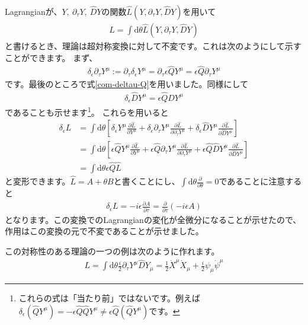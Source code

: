 \documentclass[report,paper=a4, fontsize=12pt, line_length=16cm, number_of_lines=34,dvipdfmx]{jlreq}
\numberwithin{equation}{chapter}
\numberwithin{equation}{section}
\newcommand{\del}{\partial}
\newcommand{\deldel}[2]{\frac{\del {#1}}{\del {#2}}}
\newcommand{\Qh}{\widehat{Q}}
\newcommand{\Dh}{\widehat{D}}
\newcommand{\Lh}{\widehat{L}}
\newcommand{\di}{\mathrm{d}}
\begin{document}
Lagrangianが、$Y,\ \del_{\tau}Y,\ \Dh Y$の関数$\Lh(Y,\del_{\tau}Y,\Dh Y)$を用いて
\begin{align}
L=\int \di\theta \Lh(Y,\del_{\tau}Y,\Dh Y)
\end{align}
と書けるとき、理論は超対称変換に対して不変です。これは次のようにして示すことができます。
まず、
\begin{align}
\delta_{\epsilon} \del_{\tau} Y^{\mu}:=
\del_{\tau}\delta_{\epsilon}Y^{\mu}
=\del_{\tau}\epsilon \Qh Y^{\mu}
=\epsilon \Qh \del_{\tau} Y^{\mu}
\end{align}
です。最後のところで式\eqref{com-deltau-Q}を用いました。同様にして
\begin{align}
\delta_{\epsilon} \Dh Y^{\mu}=\epsilon \Qh \Dh Y^{\mu}
\end{align}
であることも示せます\footnote{これらの式は「当たり前」ではないです。例えば$\delta_{\epsilon} (\Qh Y^{\mu})=- \epsilon \Qh \Qh Y^{\mu}
\ne\epsilon \Qh (\Qh Y^{\mu})
$です。}。
これらを用いると
\begin{align}
\delta_{\epsilon} L
&=\int \di \theta 
\left[\delta_{\epsilon} Y^{\mu}\deldel{\Lh}{Y^{\mu}}
+\delta_{\epsilon} \del_{\tau} Y^{\mu}\deldel{\Lh}{\del_{\tau} Y^{\mu}}
+\delta_{\epsilon} \Dh Y^{\mu}\deldel{\Lh}{\Dh Y^{\mu}}
\right]\nonumber\\
&=\int \di \theta 
\left[\epsilon\Qh Y^{\mu}\deldel{\Lh}{Y^{\mu}}
+\epsilon\Qh \del_{\tau} Y^{\mu}\deldel{\Lh}{\del_{\tau} Y^{\mu}}
+\epsilon\Qh \Dh Y^{\mu}\deldel{\Lh}{\Dh Y^{\mu}}
\right]\nonumber\\
&=\int \di \theta \epsilon \Qh \Lh
\end{align}
と変形できます。$\Lh=A+\theta B$と書くことにし、$\int \di \theta \deldel{}{\theta}=0$であることに注意すると
\begin{align}
\delta_{\epsilon} L=-i\epsilon \deldel{A}{\tau}
=\deldel{}{\tau}(-i\epsilon A)
\end{align}
となります。この変換でのLagrangianの変化が全微分になることが示せたので、作用はこの変換の元で不変であることが示せました。

この対称性のある理論の一つの例は次のように作れます。
\begin{align}
L=\int \di \theta \frac{i}{2}\del_{\tau} Y^{\mu} \Dh Y_{\mu}
=\frac12 \dot{X}^{\mu}\dot{X}_{\mu} +\frac i2 \psi_{\mu}\dot{\psi}^{\mu} 
\label{susyQM0}
\end{align}
\end{document}
